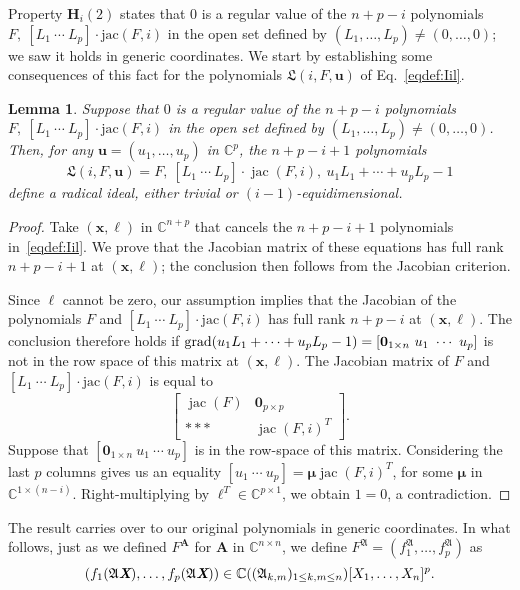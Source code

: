 \documentclass[12pt]{article}
\def\frkL{\mathfrak{L}}
\def\A{\mathfrak{A}}
\def\Xb{\textit{\textbf{X}}}
\def\mA{{\bm A}}
\def\ub{{\bm u}}
\def\xb{{\bm x}}
\DeclareMathOperator{\jac}{jac}
\def\C{\mathbb{C}}
\newtheorem{lemma}[theorem]{Lemma}
\begin{document}
Property ${\bm H}_i(2)$ states that $0$ is a regular value of the
$n+p-i$ polynomials $F,\ [L_1~\cdots~L_p]\cdot \mathrm {jac}(F,i)$ in
the open set defined by $(L_1,\dots,L_p) \ne (0,\dots,0)$; we saw it
holds in generic coordinates. We start by establishing some
consequences of this fact for the polynomials ${\frkL}(i, F, \bm u)$
of Eq.~\eqref{eqdef:Iil}.
\begin{lemma}\label{prop:RadLagPolarV}
  Suppose that $0$ is a regular value of the $n+p-i$ polynomials
  $F,\ [L_1~\cdots~L_p]\cdot \mathrm {jac}(F,i)$ in the open set
  defined by $(L_1,\dots,L_p) \ne (0,\dots,0)$. Then, for any $\ub =
  (u_1,\hdots,u_p)$ in $\C^p$, the $n+p-i+1$ polynomials
  \begin{equation*}
    {\frkL}(i, F, \bm u) = F,\ [L_1~\cdots~L_p]\cdot \jac(F, i),\ u_1 L_1 + \cdots + u_p L_p -1
  \end{equation*}
  define a radical ideal, either trivial or $(i-1)$-equidimensional.
\end{lemma}
\begin{proof}
  Take $(\xb,\bm \ell)$ in $\C^{n+p}$ that cancels the $n+p-i+1$
  polynomials in~\eqref{eqdef:Iil}. We prove that the Jacobian matrix
  of these equations has full rank $n+p-i+1$ at $(\xb,\bm\ell)$;
  the conclusion then follows from the Jacobian criterion.

  Since $\bm\ell$ cannot be zero, our assumption implies that the
  Jacobian of the polynomials $F$ and $[L_1~\cdots~L_p]\cdot \mathrm
  {jac}(F,i)$ has full rank $n+p-i$ at $(\xb,\bm\ell)$. The conclusion
  therefore holds if ${\rm grad}(u_1 L_1 + \cdots + u_p L_p-1) = [
    {\bm 0}_{1 \times n} ~ u_1~ \cdots ~u_p ]$ is not in the row space
  of this matrix at $(\xb,\bm\ell)$. The Jacobian matrix of $F$ and
  $[L_1~\cdots~L_p]\cdot \mathrm {jac}(F,i)$ is equal to
  \[
  \left[ 
    \begin{array}{cc}
      \jac(F) & {\bm 0}_{p \times p}\\
     *** &  \jac(F,i)^T 
    \end{array}
    \right].
  \]
  Suppose that $[ {\bm 0}_{1 \times n} ~ u_1~ \cdots ~u_p]$ is in the
  row-space of this matrix. Considering the last $p$ columns gives us
  an equality $[u_1 ~ \cdots ~ u_p] = \bm \mu \jac(F,i)^T $, for
  some $\bm \mu$ in $\C^{1 \times (n-i)}$. Right-multiplying by $\bm
  \ell^T \in \C^{p \times 1}$, we obtain $1 = 0$, a contradiction.
\end{proof}

The result carries over to our original polynomials in generic
coordinates. In what follows, just as we defined $F^\mA$ for $\mA$ in
$\C^{n\times n}$, we define $F^{\A}=(f_1^{\A},\hdots,f_p^{\A})$
as \[(f_1(\A\Xb),\hdots,f_p(\A\Xb)) \in \C((\A_{k,m})_{1 \le k,m \le
  n})[X_1,\dots,X_n]^p.\]
\end{document}

